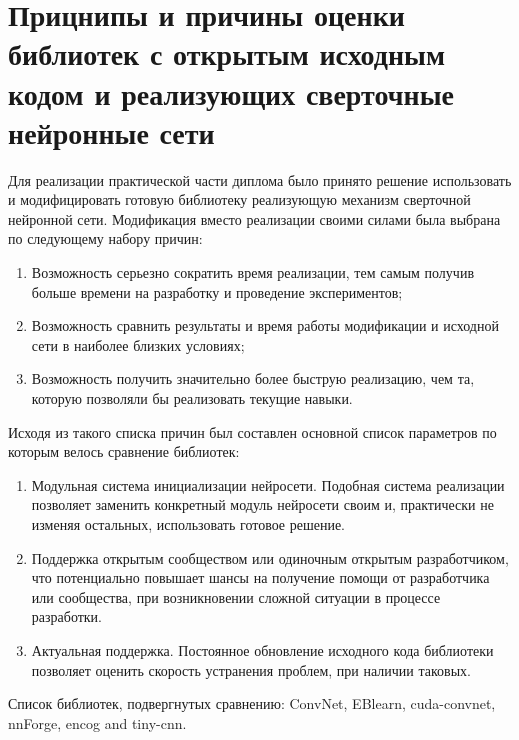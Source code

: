 \documentclass[utf8,usehyperref,14pt]{G7-32}
\begin{document}
\section{Прицнипы и причины оценки библиотек с открытым исходным кодом и реализующих сверточные нейронные сети}
Для реализации практической части диплома было принято решение использовать и модифицировать готовую библиотеку реализующую механизм сверточной нейронной сети. Модификация вместо реализации своими силами была выбрана по следующему набору причин:
\begin{enumerate}
\item Возможность серьезно сократить время реализации, тем самым получив больше времени на разработку и проведение экспериментов;
\item Возможность сравнить результаты и время работы модификации и исходной сети в наиболее близких условиях;
\item Возможность получить значительно более быструю реализацию, чем та, которую позволяли бы реализовать текущие навыки.
\end{enumerate}
Исходя из такого списка причин был составлен основной список параметров по которым велось сравнение библиотек:
\begin{enumerate}
\item Модульная система инициализации нейросети. Подобная система реализации позволяет заменить конкретный модуль нейросети своим и, практически не изменяя остальных, использовать готовое решение.
\item Поддержка открытым сообществом или одиночным открытым разработчиком, что потенциально повышает шансы на получение помощи от разработчика или сообщества, при возникновении сложной ситуации в процессе разработки.
\item Актуальная поддержка. Постоянное обновление исходного кода библиотеки позволяет оценить скорость устранения проблем, при наличии таковых.
\end{enumerate}
Список библиотек, подвергнутых сравнению:
ConvNet, EBlearn, cuda-convnet, nnForge, encog and tiny-cnn.
\end{document}

